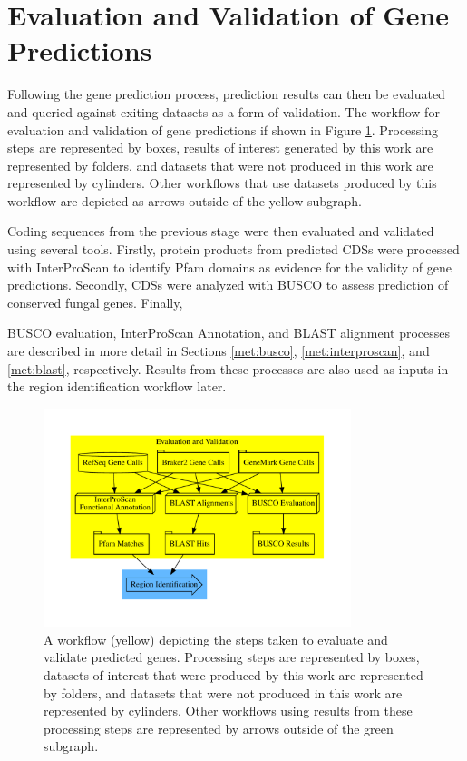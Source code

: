 \section{Evaluation and Validation of Gene Predictions}
\label{met:valid-workflow}

Following the gene prediction process, prediction results can then be
evaluated and queried against exiting datasets as a form of
validation. The workflow for evaluation and validation of gene
predictions if shown in Figure \ref{fig:valid}. Processing steps are
represented by boxes, results of interest generated by this work are
represented by folders, and datasets that were not produced in this
work are represented by cylinders. Other workflows that use datasets
produced by this workflow are depicted as arrows outside of the yellow
subgraph.

Coding sequences from the previous stage were then evaluated and
validated using several tools. Firstly, protein products from
predicted CDSs were processed with InterProScan to identify Pfam
domains as evidence for the validity of gene predictions. Secondly,
CDSs were analyzed with BUSCO to assess prediction of conserved fungal
genes. Finally, 

BUSCO evaluation, InterProScan Annotation, and BLAST alignment
processes are described in more detail in Sections \ref{met:busco},
\ref{met:interproscan}, and \ref{met:blast}, respectively. Results
from these processes are also used as inputs in the region
identification workflow later.

\begin{figure}
  \centering
  \includegraphics[width=0.8\textwidth]{figures/eval-met.pdf}
  \caption{A workflow (yellow) depicting the steps taken to evaluate
    and validate predicted genes. Processing steps are represented by
    boxes, datasets of interest that were produced by this work are
    represented by folders, and datasets that were not produced in
    this work are represented by cylinders. Other workflows using
    results from these processing steps are represented by arrows
    outside of the green subgraph.}
  \label{fig:valid}
\end{figure}

